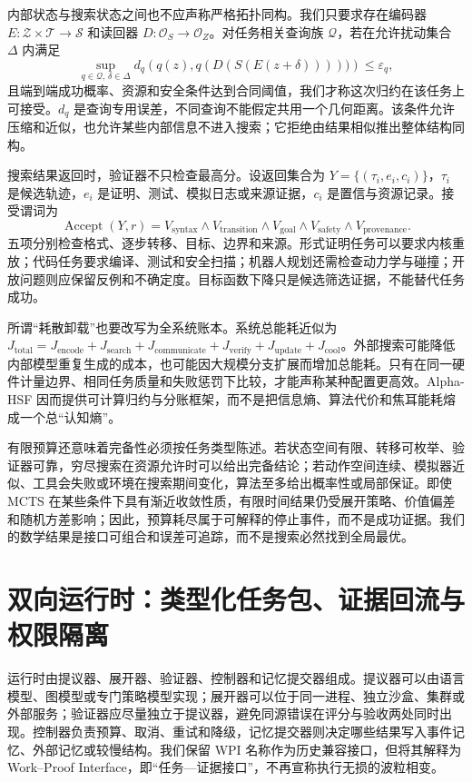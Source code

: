 内部状态与搜索状态之间也不应声称严格拓扑同构。我们只要求存在编码器 $E:\mathcal{Z}\times\mathcal{T}\to\mathcal{S}$ 和读回器 $D:\mathcal{O}_S\to\mathcal{O}_Z$。对任务相关查询族 $\mathcal{Q}$，若在允许扰动集合 $\Delta$ 内满足
\[
\sup_{q\in\mathcal{Q},\,\delta\in\Delta}
d_q\!\left(q(z),q(D(S(E(z+\delta)))))\right)\le\varepsilon_q,
\]
且端到端成功概率、资源和安全条件达到合同阈值，我们才称这次归约在该任务上可接受。$d_q$ 是查询专用误差，不同查询不能假定共用一个几何距离。该条件允许压缩和近似，也允许某些内部信息不进入搜索；它拒绝由结果相似推出整体结构同构。

搜索结果返回时，验证器不只检查最高分。设返回集合为 $Y=\{(\tau_i,e_i,c_i)\}$，$\tau_i$ 是候选轨迹，$e_i$ 是证明、测试、模拟日志或来源证据，$c_i$ 是置信与资源记录。接受谓词为
\[
\operatorname{Accept}(Y,r)=
V_{\mathrm{syntax}}\land V_{\mathrm{transition}}\land
V_{\mathrm{goal}}\land V_{\mathrm{safety}}\land V_{\mathrm{provenance}}.
\]
五项分别检查格式、逐步转移、目标、边界和来源。形式证明任务可以要求内核重放；代码任务要求编译、测试和安全扫描；机器人规划还需检查动力学与碰撞；开放问题则应保留反例和不确定度。目标函数下降只是候选筛选证据，不能替代任务成功。

所谓“耗散卸载”也要改写为全系统账本。系统总能耗近似为 $J_{\mathrm{total}}=J_{\mathrm{encode}}+J_{\mathrm{search}}+J_{\mathrm{communicate}}+J_{\mathrm{verify}}+J_{\mathrm{update}}+J_{\mathrm{cool}}$。外部搜索可能降低内部模型重复生成的成本，也可能因大规模分支扩展而增加总能耗。只有在同一硬件计量边界、相同任务质量和失败惩罚下比较，才能声称某种配置更高效。Alpha-HSF 因而提供可计算归约与分账框架，而不是把信息熵、算法代价和焦耳能耗熔成一个总“认知熵”。

有限预算还意味着完备性必须按任务类型陈述。若状态空间有限、转移可枚举、验证器可靠，穷尽搜索在资源允许时可以给出完备结论；若动作空间连续、模拟器近似、工具会失败或环境在搜索期间变化，算法至多给出概率性或局部保证。即使 MCTS 在某些条件下具有渐近收敛性质，有限时间结果仍受展开策略、价值偏差和随机方差影响；因此，预算耗尽属于可解释的停止事件，而不是成功证据。我们的数学结果是接口可组合和误差可追踪，而不是搜索必然找到全局最优。

\section{双向运行时：类型化任务包、证据回流与权限隔离}
\label{sec:alpha_hsf_software_runtime}

运行时由提议器、展开器、验证器、控制器和记忆提交器组成。提议器可以由语言模型、图模型或专门策略模型实现；展开器可以位于同一进程、独立沙盒、集群或外部服务；验证器应尽量独立于提议器，避免同源错误在评分与验收两处同时出现。控制器负责预算、取消、重试和降级，记忆提交器则决定哪些结果写入事件记忆、外部记忆或较慢结构。我们保留 WPI 名称作为历史兼容接口，但将其解释为 Work--Proof Interface，即“任务—证据接口”，不再宣称执行无损的波粒相变。


